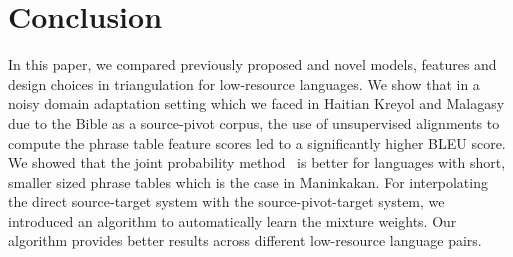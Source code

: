 \documentclass[11pt]{article}
\begin{document}
\section{Conclusion}
In this paper, we compared previously proposed and novel models, features and design choices in triangulation for low-resource languages. We show that in a noisy domain adaptation setting which we faced in Haitian Kreyol and Malagasy due to the Bible as a source-pivot corpus, the use of unsupervised alignments to compute the phrase table feature scores led to a significantly higher BLEU score. We showed that the joint probability method~\cite{Cohn:07} is better for languages with short, smaller sized phrase tables which is the case in Maninkakan. For interpolating the direct source-target system with the source-pivot-target system, we introduced an algorithm to automatically learn the mixture weights. Our algorithm provides better results across different low-resource language pairs.



\end{document}
